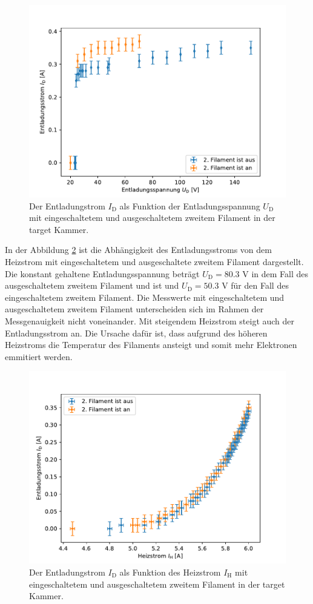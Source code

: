 \begin{figure}[H]
\centering
\includegraphics[scale=0.6]{3_1_Spannung.pdf}
\caption{Der Entladungstrom $I_{\mathrm{D}}$ als Funktion der Entladungsspannung $U_{\mathrm{D}}$   mit eingeschaltetem und ausgeschaltetem zweitem Filament in der target Kammer.}
\label{fig:3_1_Spannung}
\end{figure}
In der Abbildung \ref{fig:3_1_Strom} ist die Abhängigkeit des Entladungsstroms von dem Heizstrom mit eingeschaltetem und ausgeschaltete zweitem Filament dargestellt. Die konstant gehaltene Entladungsspannung beträgt $U_{\mathrm{D}}=80.3$ V in dem Fall des ausgeschaltetem zweitem Filament und  ist und $U_{\mathrm{D}}=50.3$ V für den Fall des eingeschaltetem zweitem Filament.   Die Messwerte mit eingeschaltetem und ausgeschaltetem zweitem Filament unterscheiden sich im Rahmen der Messgenauigkeit nicht voneinander. Mit steigendem Heizstrom steigt auch der Entladungsstrom an. Die Ursache dafür ist, dass aufgrund des höheren Heizstroms die Temperatur des Filaments ansteigt und somit mehr Elektronen emmitiert werden. 
\begin{figure}[H]
\centering
\includegraphics[scale=0.6]{3_1_Strom.pdf}
\caption{Der Entladungstrom $I_{\mathrm{D}}$ als Funktion des Heizstrom $I_{\mathrm{H}}$  mit eingeschaltetem und ausgeschaltetem zweitem Filament in der target Kammer.}
\label{fig:3_1_Strom}
\end{figure}
